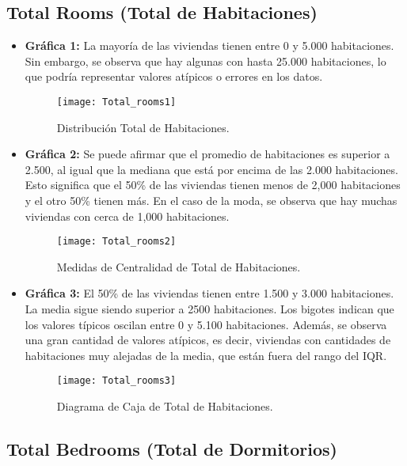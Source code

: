 \documentclass[a4paper, 10pt]{article}
\begin{document}
\subsection{Total Rooms (Total de Habitaciones)}

\begin{itemize}
    \item \textbf{Gráfica 1:} La mayoría de las viviendas tienen entre 0 y 5.000 habitaciones. Sin embargo, se observa que hay algunas con hasta 25.000 habitaciones, lo que podría representar valores atípicos o errores en los datos.
    \begin{figure}[H]
        \centering
        \texttt{[image: Total\_rooms1]}
        \caption{Distribución Total de Habitaciones.}
    \end{figure}

    \item \textbf{Gráfica 2:} Se puede afirmar que el promedio de habitaciones es superior a 2.500, al igual que la mediana que está por encima de las 2.000 habitaciones. Esto significa que el 50\% de las viviendas tienen menos de 2,000 habitaciones y el otro 50\% tienen más. En el caso de la moda, se observa que hay muchas viviendas con cerca de 1,000 habitaciones.
    \begin{figure}[H]
        \centering
        \texttt{[image: Total\_rooms2]}
        \caption{Medidas de Centralidad de Total de Habitaciones.}
    \end{figure}

    \item \textbf{Gráfica 3:} El 50\% de las viviendas tienen entre 1.500 y 3.000 habitaciones. La media sigue siendo superior a 2500 habitaciones. Los bigotes indican que los valores típicos oscilan entre 0 y 5.100 habitaciones.
    Además, se observa una gran cantidad de valores atípicos, es decir, viviendas con cantidades de habitaciones muy alejadas de la media, que están fuera del rango del IQR.
    \begin{figure}[H]
        \centering
        \texttt{[image: Total\_rooms3]}
        \caption{Diagrama de Caja de Total de Habitaciones.}
    \end{figure}
\end{itemize}

\subsection{Total Bedrooms (Total de Dormitorios)}
\end{document}
